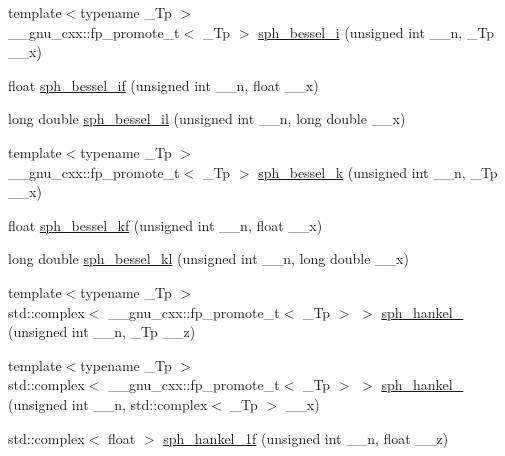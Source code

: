\begin{DoxyCompactItemize}
\item 
{\footnotesize template$<$typename \+\_\+\+Tp $>$ }\\\+\_\+\+\_\+gnu\+\_\+cxx\+::fp\+\_\+promote\+\_\+t$<$ \+\_\+\+Tp $>$ \hyperlink{group__gnu__math__spec__func_ga156b8154b27b7898c8b2abf4284f7323}{sph\+\_\+bessel\+\_\+i} (unsigned int \+\_\+\+\_\+n, \+\_\+\+Tp \+\_\+\+\_\+x)
\item 
float \hyperlink{group__gnu__math__spec__func_gacc6738f18c1ba19452b9dd814d11c00c}{sph\+\_\+bessel\+\_\+if} (unsigned int \+\_\+\+\_\+n, float \+\_\+\+\_\+x)
\item 
long double \hyperlink{group__gnu__math__spec__func_gaf4392d9ed177913febdcbfccb947dbca}{sph\+\_\+bessel\+\_\+il} (unsigned int \+\_\+\+\_\+n, long double \+\_\+\+\_\+x)
\item 
{\footnotesize template$<$typename \+\_\+\+Tp $>$ }\\\+\_\+\+\_\+gnu\+\_\+cxx\+::fp\+\_\+promote\+\_\+t$<$ \+\_\+\+Tp $>$ \hyperlink{group__gnu__math__spec__func_ga288b28f2c6995d052a4f5f17293cbf1a}{sph\+\_\+bessel\+\_\+k} (unsigned int \+\_\+\+\_\+n, \+\_\+\+Tp \+\_\+\+\_\+x)
\item 
float \hyperlink{group__gnu__math__spec__func_gaf886e8f8dfd2af0c4a9c5929d193d12f}{sph\+\_\+bessel\+\_\+kf} (unsigned int \+\_\+\+\_\+n, float \+\_\+\+\_\+x)
\item 
long double \hyperlink{group__gnu__math__spec__func_ga22f6a73e50e7020a7c2fa64ce1b9be41}{sph\+\_\+bessel\+\_\+kl} (unsigned int \+\_\+\+\_\+n, long double \+\_\+\+\_\+x)
\item 
{\footnotesize template$<$typename \+\_\+\+Tp $>$ }\\std\+::complex$<$ \+\_\+\+\_\+gnu\+\_\+cxx\+::fp\+\_\+promote\+\_\+t$<$ \+\_\+\+Tp $>$ $>$ \hyperlink{group__gnu__math__spec__func_ga4424f565fb224ab88b177beb65d08305}{sph\+\_\+hankel\+\_} (unsigned int \+\_\+\+\_\+n, \+\_\+\+Tp \+\_\+\+\_\+z)
\item 
{\footnotesize template$<$typename \+\_\+\+Tp $>$ }\\std\+::complex$<$ \+\_\+\+\_\+gnu\+\_\+cxx\+::fp\+\_\+promote\+\_\+t$<$ \+\_\+\+Tp $>$ $>$ \hyperlink{group__gnu__math__spec__func_ga3d256857c000a966e89526cb99253aca}{sph\+\_\+hankel\+\_} (unsigned int \+\_\+\+\_\+n, std\+::complex$<$ \+\_\+\+Tp $>$ \+\_\+\+\_\+x)
\item 
std\+::complex$<$ float $>$ \hyperlink{group__gnu__math__spec__func_ga70d4fc01069f3f0ac0e3b52fe1dffea4}{sph\+\_\+hankel\+\_\+1f} (unsigned int \+\_\+\+\_\+n, float \+\_\+\+\_\+z)
\item 

\end{DoxyCompactItemize}
